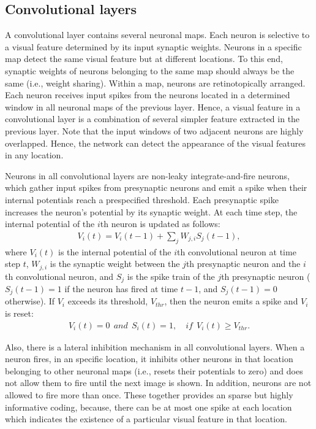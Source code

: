 \documentclass[preprint,5p,12pt,twocolumn]{article}
\begin{document}
\subsection*{Convolutional layers}
A convolutional layer contains several neuronal maps. Each neuron is selective to a visual feature determined by its input synaptic weights. Neurons in a specific map detect the same visual feature but at different locations. To this end, synaptic weights of neurons belonging to the same map should always be the same (i.e., weight sharing). Within a map, neurons are retinotopically arranged. Each neuron receives input spikes from the neurons located in a determined window in all neuronal maps of the previous layer. Hence, a visual feature in a convolutional layer is a combination of several simpler feature extracted in the previous layer. Note that the input windows of two adjacent neurons are highly overlapped. Hence, the network can detect the appearance of the visual features in any location.

Neurons in all convolutional layers are non-leaky integrate-and-fire neurons, which gather input spikes from presynaptic neurons and emit a spike when their internal potentials reach a prespecified threshold. Each presynaptic spike increases the neuron's potential by its synaptic weight. At each time step, the internal potential of the $i$th  neuron is updated as follows:
\begin{eqnarray}
\label{eq:neuron}
V_i(t)=V_i(t-1)+\sum_{j}{W_{j,i} S_j (t-1)},
\end{eqnarray}
where $V_i(t)$ is the internal potential of the $i$th convolutional neuron at time step $t$,  $W_{j,i}$ is the synaptic weight between the $j$th presynaptic neuron and the $i$th convolutional neuron, and $S_j$ is the spike train of the $j$th presynaptic neuron ($S_j(t-1)=1$ if the neuron has fired at time $t-1$, and $S_j(t-1)=0$ otherwise). If $V_i$ exceeds its threshold, $V_{thr}$, then the neuron emits a spike and $V_i$ is reset:
\begin{eqnarray}
\label{eq:neuron}
V_i(t)=0\:\: and \:\: S_i(t)=1, \quad if \:\: V_i(t)\geq V_{thr}.
\end{eqnarray}

Also, there is a lateral inhibition mechanism in all convolutional layers. When a neuron fires, in an specific location, it inhibits other neurons in that location belonging to other neuronal maps (i.e., resets their potentials to zero) and does not allow them to fire until the next image is shown. In addition, neurons are not allowed to fire more than once. These together provides an sparse but highly informative coding, because, there can be at most one spike at each location which indicates the existence of a particular visual feature in that location.
\end{document}
